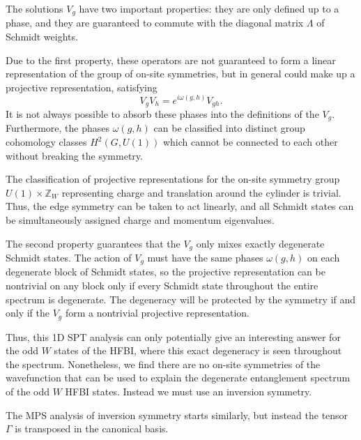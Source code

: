 The solutions $V_g$ have two important properties: they are only defined up to a phase,
and they are guaranteed to commute with the diagonal matrix $\Lambda$ of Schmidt weights.  

Due to the first property, these operators are not guaranteed to form a linear
representation of the group of on-site symmetries, but in general could make
up a projective representation, satisfying
$$V_g V_h = e^{i \omega(g, h)} V_{gh}.$$ 
It is not always possible to absorb these phases into the definitions of the $V_g$.
Furthermore, the phases $\omega(g, h)$ can be classified into distinct group cohomology classes
$H^2(G, U(1))$ which cannot be connected to each other without breaking the symmetry.

The classification of projective representations for the on-site symmetry group $U(1) \times \mathbb{Z}_W$ representing charge and translation around the cylinder is trivial. Thus, the edge
symmetry can be taken to act linearly, and all Schmidt states can be simultaneously assigned 
charge and momentum eigenvalues. 

The second property guarantees that the $V_g$ only mixes exactly degenerate Schmidt states.
The action of $V_g$ must have the same phases $\omega(g, h)$ on each degenerate block of Schmidt states, so the projective representation can be nontrivial on any block only if every Schmidt state throughout the entire spectrum is degenerate. The degeneracy will be protected by the symmetry if and only if the $V_g$ form a nontrivial projective representation. 

Thus, this 1D SPT analysis can only potentially give an interesting answer for the odd $W$ states of the HFBI, where this exact degeneracy is seen throughout the spectrum. Nonetheless, we find there are no on-site symmetries of the wavefunction that can be used to explain the degenerate
entanglement spectrum of the odd $W$ HFBI states. Instead we must use an inversion symmetry. 

The MPS analysis of inversion symmetry starts similarly, but instead the tensor $\Gamma$ is transposed in the canonical basis.


